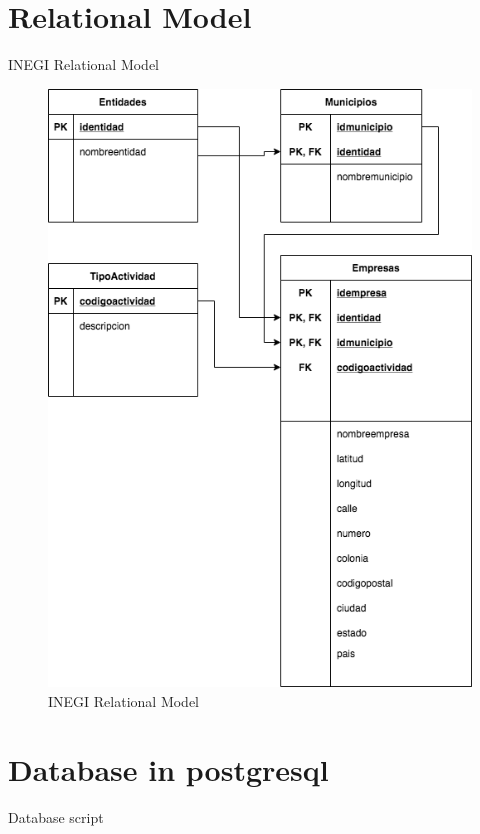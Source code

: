 \documentclass[10pt]{article}         %
\begin{document}
\section{Relational Model}
INEGI Relational Model

\begin{figure}[h]
     \includegraphics[scale=0.4]{relational_inegi}
     \caption{INEGI Relational Model}
\end{figure}


\section{Database in postgresql}
Database script
\end{document}
